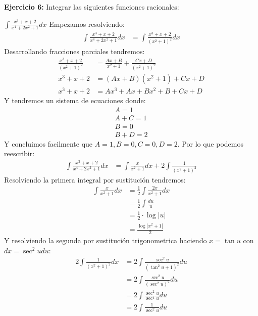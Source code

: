 \documentclass[../main.tex]{subfiles}
\begin{document}
    \question \textbf{Ejercicio 6:} Integrar las siguientes funciones racionales:
    \begin{partes}
        \parte $\int \frac{x^3+x+2}{x^4+2x^2+1} dx$
        Empezamos resolviendo:
        \begin{align*}
            \int \frac{x^3+x+2}{x^4+2x^2+1} dx&= \int \frac{x^3+x+2}{(x^2+1)^2}dx
        \end{align*}
        Desarrollando fracciones parciales tendremos:
        \begin{align*}
            \frac{x^3+x+2}{(x^2+1)^2} &= \frac{Ax + B}{x^2+1} + \frac{Cx+D}{(x^2+1)^2}\\
            x^3+x+2 &= (Ax+B)(x^2+1) + Cx + D\\
            x^3 + x +2 &= Ax^3 + Ax + Bx^2 + B + Cx + D
        \end{align*}
        Y tendremos un sistema de ecuaciones donde:
        \begin{align*}
            A = 1\\
            A + C = 1\\
            B = 0\\
            B + D = 2
        \end{align*}
        Y concluimos facilmente que $A=1, B=0, C=0, D=2$. Por lo que podemos reescribir:
        \begin{align*}
            \int \frac{x^3+x+2}{x^4+2x^2+1} dx &= \int \frac{x}{x^2+1}dx + 2\int\frac{1}{(x^2+1)^2}
        \end{align*}
        Resolviendo la primera integral por sustitución tendremos:
        \begin{align*}
            \int \frac{x}{x^2+1} dx &= \frac{1}{2} \int \frac{2x}{x^2+1} dx\\
            &= \frac{1}{2}\int \frac{du}{u}\\
            &= \frac{1}{2} \cdot \log|u|\\
            &= \frac{\log|x^2+1|}{2}
        \end{align*}
        Y resolviendo la segunda por sustitución trigonometrica haciendo $x = \tan u$ con $dx = \sec^2 u du$:
        \begin{align*}
            2\int\frac{1}{(x^2+1)^2} dx&= 2\int \frac{\sec^2 u}{(\tan^2 u +1)^2} du\\
            &= 2\int \frac{\sec^2 u}{(\sec^2 u)^2} du\\
            &= 2\int \frac{\sec^2 u}{\sec^4 u} du\\
            &= 2\int \frac{1}{\sec^2 u}du\\

\end{align*}
\end{partes}
\end{document}
